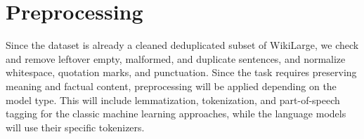 \documentclass[11pt,a4paper]{article}
\begin{document}
\section*{Preprocessing}
Since the dataset is already a cleaned deduplicated subset of WikiLarge, we check and remove leftover empty, malformed, and duplicate sentences, and normalize whitespace, quotation marks, and punctuation.
Since the task requires preserving meaning and factual content, preprocessing will be applied depending on the model type. This will include lemmatization, tokenization, and part-of-speech tagging for the classic machine learning approaches, while the language models will use their specific tokenizers. 

\newpage
\printbibliography
\end{document}
